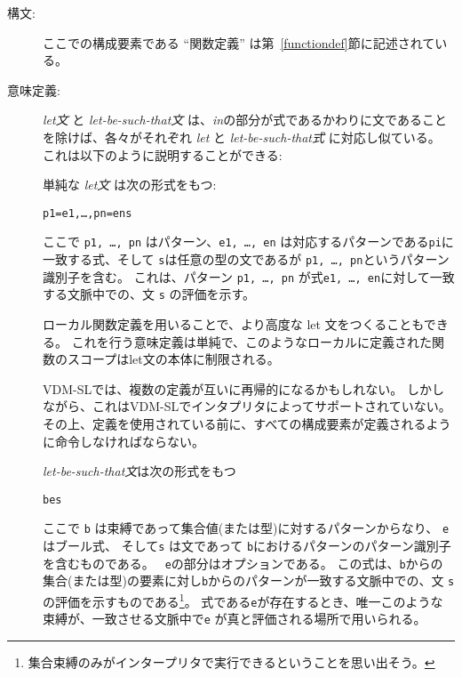 \documentclass[\pformat,12pt]{jarticle}
\begin{document}
\begin{description}
\item[構文:]





 ここでの構成要素である ``関数定義'' は第~\ref{functiondef}節に記述されている。

\item[意味定義:]  {\it let文} と {\it let-be-such-that文} は、{\it in}の部分が式であるかわりに文であることを除けば、各々がそれぞれ {\it let} と {\it let-be-such-that式} に対応し似ている。
これは以下のように説明することができる:

  単純な {\it let文} は次の形式をもつ:
  \begin{alltt}
     p1 = e1, \ldots, pn = en  s
  \end{alltt}
ここで {\tt p1, \ldots, pn} はパターン、{\tt e1, \ldots, en} は対応するパターンである{\tt pi}に一致する式、そして {\tt s}は任意の型の文であるが {\tt  p1, \ldots, pn}というパターン識別子を含む。 
これは、パターン {\tt p1, \ldots, pn} が式{\tt e1, \ldots, en}に対して一致する文脈中での、文 {\tt s} の評価を示す。

ローカル関数定義を用いることで、より高度な let 文をつくることもできる。
これを行う意味定義は単純で、このようなローカルに定義された関数のスコープはlet文の本体に制限される。

  VDM-SLでは、複数の定義が互いに再帰的になるかもしれない。
  しかしながら、これはVDM-SLでインタプリタによってサポートされていない。
  その上、定義を使用されている前に、すべての構成要素が定義されるように命令しなければならない。

  {\it let-be-such-that文}は次の形式をもつ
  \begin{alltt}
     b  e  s
  \end{alltt}
ここで {\tt b} は束縛であって集合値(または型)に対するパターンからなり、 {\tt  e} はブール式、 そして{\tt s} は文であって {\tt b}におけるパターンのパターン識別子を含むものである。 
 {\tt {} e}の部分はオプションである。
この式は、{\tt b}からの集合(または型)の要素に対し{\tt b}からのパターンが一致する文脈中での、文 {\tt s} の評価を示すものである\footnote{集合束縛のみがインタープリタで実行できるということを思い出そう。}。 
 式である{\tt e}が存在するとき、唯一このような束縛が、一致させる文脈中で{\tt e} が真と評価される場所で用いられる。
     

\end{description}
\end{document}
